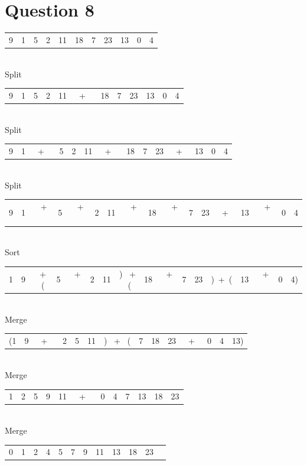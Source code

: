 \documentclass[11pt]{article}
\begin{document}
\section{Question 8}
\label{q8}
\begin{center}
\begin{tabular}{ c|c|c|c|c|c|c|c|c|c|c }
9 & 1 & 5 & 2 & 11 & 18 & 7 & 23 & 13 & 0 & 4
\end{tabular}
\\Split\\
\begin{tabular}{ c|c|c|c|c|c|c|c|c|c|c|c } 
9 & 1 & 5 & 2 & 11 & \ + \ &18 & 7 & 23 & 13 & 0 & 4
\end{tabular}
\\Split\\
\begin{tabular}{ c|c|c|c|c|c|c|c|c|c|c|c|c|c } 
9 & 1 &\ + \ & 5 & 2 & 11 & \ + \ &18 & 7 & 23 &\ +\ & 13 & 0 & 4
\end{tabular}
\\Split\\
\begin{tabular}{ c|c|c|c|c|c|c|c|c|c|c|c|c|c|c|c|c } 
9 & 1 &\ + \ & 5 & \ + \ & 2 & 11 & \ + \ &18 & \ + \ & 7 & 23 &\ +\ & 13& \ + \ &  0 & 4
\end{tabular}
\\Sort\\
\begin{tabular}{ c|c|c|c|c|c|c|c|c|c|c|c|c|c|c|c|c } 
1 & 9 &\ + \ (& 5 & \ + \ & 2 & 11 &) \ + \ (&18 & \ + \ & 7 & 23 &)\ +\ (& 13& \ + \ &  0 & 4)
\end{tabular}
\\Merge\\
\begin{tabular}{ c|c|c|c|c|c|c|c|c|c|c|c|c|c } 
(1 & 9 &\ + \ & 2 & 5 & 11 &) \ + \ (&7 & 18 & 23 &\ +\ & 0 & 4 & 13)
\end{tabular}
\\Merge\\
\begin{tabular}{ c|c|c|c|c|c|c|c|c|c|c|c } 
1 & 2 & 5 & 9 & 11 & \ + \ &0 & 4 & 7 & 13 & 18 & 23
\end{tabular}
\\Merge\\
\begin{tabular}{ c|c|c|c|c|c|c|c|c|c|c|c } 
0 & 1 & 2 & 4 & 5 &7 & 9 & 11 & 13 & 18 & 23
\end{tabular}
\end{center}
\end{document}
